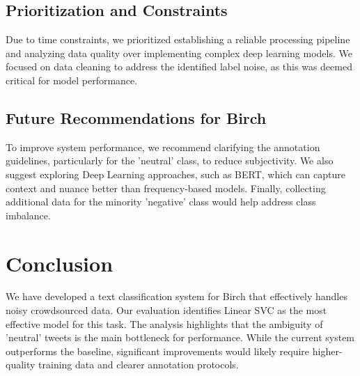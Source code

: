 \documentclass[11pt]{article}
\begin{document}
\subsection{Prioritization and Constraints}
Due to time constraints, we prioritized establishing a reliable processing pipeline and analyzing data quality over implementing complex deep learning models. We focused on data cleaning to address the identified label noise, as this was deemed critical for model performance.

\subsection{Future Recommendations for Birch}
To improve system performance, we recommend clarifying the annotation guidelines, particularly for the 'neutral' class, to reduce subjectivity. We also suggest exploring Deep Learning approaches, such as BERT, which can capture context and nuance better than frequency-based models. Finally, collecting additional data for the minority 'negative' class would help address class imbalance.

\section{Conclusion}
We have developed a text classification system for Birch that effectively handles noisy crowdsourced data. Our evaluation identifies Linear SVC as the most effective model for this task. The analysis highlights that the ambiguity of 'neutral' tweets is the main bottleneck for performance. While the current system outperforms the baseline, significant improvements would likely require higher-quality training data and clearer annotation protocols.
\end{document}
